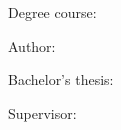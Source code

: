 \vspace*{.2cm}
\noindent
Degree course: \hspace*{2.5cm} \Program

\vspace*{.7cm}
\noindent
Author: \hspace*{3.8cm}\Author

\vspace*{.2cm}
\noindent
Bachelor's thesis:\hspace*{2.2cm}\Title

\vspace*{.2cm}
\noindent
Supervisor:\hspace*{3.3cm}\Supervisor

\vspace*{.2cm}
\noindent
\Month \Year
\noindent

\vspace*{2cm}
\noindent
\lipsum[1]